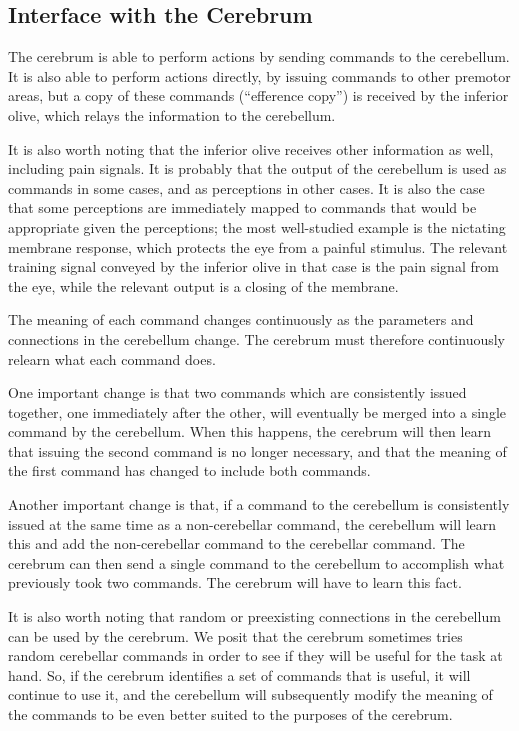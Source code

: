 \documentclass{article}
\theoremstyle{definition}
\begin{document}
\subsection{Interface with the Cerebrum}

The cerebrum is able to perform actions by sending commands to the
cerebellum. It is also able to perform actions directly, by issuing
commands to other premotor areas, but a copy of these commands
(``efference copy'') is received by the inferior olive, which relays
the information to the cerebellum. 

It is also worth noting that the inferior olive receives other
information as well, including pain signals. It is probably that the
output of the cerebellum is used as commands in some cases, and as
perceptions in other cases. It is also the case that some perceptions
are immediately mapped to commands that would be appropriate given the
perceptions; the most well-studied example is the nictating membrane
response, which protects the eye from a painful stimulus. The relevant
training signal conveyed by the inferior olive in that case is the
pain signal from the eye, while the relevant output is a closing of
the membrane.

The meaning of each command changes continuously as the parameters and
connections in the cerebellum change. The cerebrum must therefore
continuously relearn what each command does.

One important change is that two commands which are consistently
issued together, one immediately after the other, will eventually be
merged into a single command by the cerebellum. When this happens, the
cerebrum will then learn that issuing the second command is no longer
necessary, and that the meaning of the first command has changed to
include both commands.

Another important change is that, if a command to the cerebellum is
consistently issued at the same time as a non-cerebellar command, the
cerebellum will learn this and add the non-cerebellar command to the
cerebellar command. The cerebrum can then send a single command to the
cerebellum to accomplish what previously took two commands. The
cerebrum will have to learn this fact.

It is also worth noting that random or preexisting connections in the
cerebellum can be used by the cerebrum. We posit that the cerebrum
sometimes tries random cerebellar commands in order to see if they
will be useful for the task at hand. So, if the cerebrum identifies a
set of commands that is useful, it will continue to use it, and the
cerebellum will subsequently modify the meaning of the commands to be
even better suited to the purposes of the cerebrum.
\end{document}
